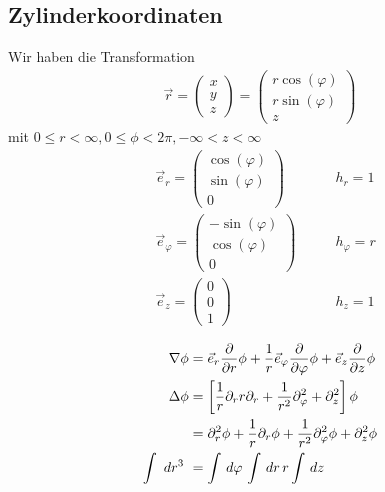 \subsection{Zylinderkoordinaten}
Wir haben die Transformation
\begin{align*}
\vec{r} = \begin{pmatrix}x\\y\\z\end{pmatrix} = \begin{pmatrix}r\cos(\varphi)
\\ r\sin(\varphi) \\ z\end{pmatrix}
\end{align*}
mit $0\le r<\infty, 0\le\phi<2\pi, -\infty<z<\infty$
\begin{align*}
&\vec{e}_r = \begin{pmatrix}\cos(\varphi) \\ \sin(\varphi) \\ 0\end{pmatrix}
\qquad &h_r = 1\\
&\vec{e}_\varphi = \begin{pmatrix}-\sin(\varphi) \\ \cos(\varphi) \\
0\end{pmatrix} \qquad &h_\varphi = r\\
&\vec{e}_z = \begin{pmatrix}0 \\ 0 \\ 1\end{pmatrix}
\qquad &h_z = 1\\
\end{align*}
\begin{align*}
\nabla\phi &= \vec{e}_r \frac{\partial}{\partial r}\phi +
\frac{1}{r}\vec{e}_\varphi\frac{\partial}{\partial \varphi}\phi + \vec{e}_z
\frac{\partial}{\partial z}\phi\\
\Delta\phi &= \left[\frac{1}{r}\partial_r r \partial_r +
\frac{1}{r^2}\partial^2_\varphi + \partial^2_z \right]\phi \\
&= \partial^2_r\phi + \frac{1}{r}\partial_r\phi +
\frac{1}{r^2}\partial^2_\varphi\phi + \partial^2_z\phi\\
\int \ dr^3\ &= \int \,d\varphi\, \int \,dr\, r \int \,dz\,
\end{align*}

